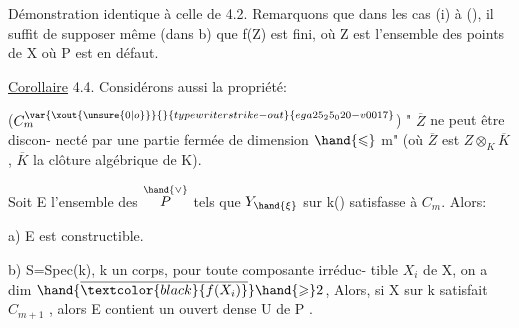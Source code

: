 Démonstration identique à celle de 4.2.   Remarquons que dans
les cas (i) à (), il suffit de supposer même (dans b) que  f(Z) est
fini, où Z est l'ensemble des points de X où  P est en défaut.

\uline{Corollaire} 4.4.    Considérons aussi la propriété:

($C_m^{\var{\xout{\unsure{0|o}}}{}{typewriter strike-out}{ega25_25_020-v0017}}$)   " $\overline{Z}$ ne peut être discon-%
necté par une partie fermée de dimension  $\hand{\leqslant}$ m" (où $\overline{Z}$ est $Z\otimes_K\overline{K}$ , $\overline{K}$
la clôture  algébrique de K).

Soit E l'ensemble des \hand{$\xi \in$} $\overset{\hand{\vee}}{P}$  tels que  $Y_{\hand{\xi}}$ sur k(\hand{$\xi$}) satisfasse à $C_m$.
Alors:

a)  E est constructible.

b)    S=Spec(k), k un corps,   pour toute composante irréduc-%
tible  $X_i$ de X, on a dim $\hand{\overline{\textcolor{black}{f(X_i)}}} \hand{\geqslant} 2$, Alors, si X sur k satisfait $C_{m+1}$ ,
alors E\hand{$_{\xi}$} contient un ouvert dense U de P .


